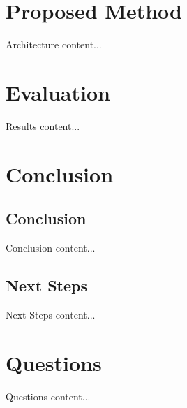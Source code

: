 \documentclass{beamer}
\begin{document}
\begin{darkframes}
        
    \section{Proposed Method}
    \begin{frame}{Architecture}
    	content...
    \end{frame}
    
    \section{Evaluation}
    \begin{frame}{Results}
    	content...
    \end{frame}
    
    \section{Conclusion}
    \subsection{Conclusion}
    \begin{frame}{Conclusion}
    	content...
    \end{frame}
    \subsection{Next Steps}
    \begin{frame}{Next Steps}
    	content...
    \end{frame}
    
    \section{Questions}
    \begin{frame}{Questions}
    	content...
    	\end{frame}
    
    
  \end{darkframes}
\end{document}
